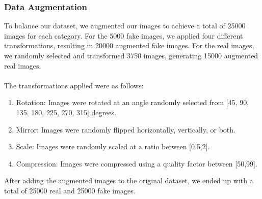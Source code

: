     \subsubsection{Data Augmentation}
    To balance our dataset, we augmented our images to achieve a total of 25000 images for each category. For the 5000 fake images, we applied four different transformations, resulting in 20000 augmented fake images. For the real images, we randomly selected and transformed 3750 images, generating 15000 augmented real images. \\\\
    The transformations applied were as follows:
    \begin{enumerate}
        \item Rotation: Images were rotated at an angle randomly selected from [45, 90, 135, 180, 225, 270, 315] degrees.
        \item Mirror: Images were randomly flipped horizontally, vertically, or both.
        \item Scale: Images were randomly scaled at a ratio between [0.5,2].
        \item Compression: Images were compressed using a quality factor between [50,99].
    \end{enumerate}
    After adding the augmented images to the original dataset, we ended up with a total of 25000 real and 25000 fake images.

